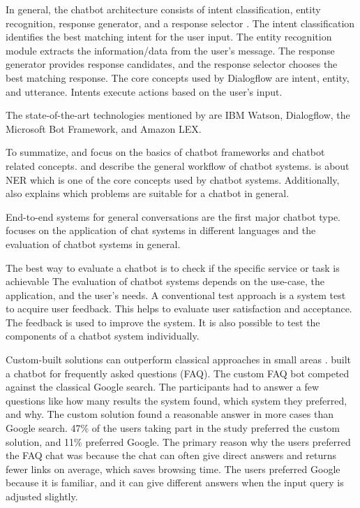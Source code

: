 In general, the chatbot architecture consists of intent classification, entity recognition, response generator, and a response selector  \cite{rahman2017programming}. 
The intent classification identifies the best matching intent for the user input.
The entity recognition module extracts the information/data from the user's message.
The response generator provides response candidates, and the response selector chooses the best matching response.
The core concepts used by Dialogflow are intent, entity, and utterance.
Intents execute actions based on the user's input. 

The state-of-the-art technologies mentioned by \citet{rahman2017programming} are IBM Watson, Dialogflow, the Microsoft Bot Framework, and Amazon LEX.

To summatize, \citet{deshpande2017survey,buiildChatbotsPython,geyer2016named} and \citet{rahman2017programming} focus on the basics of chatbot frameworks and chatbot related concepts.
\citet{deshpande2017survey} and \citet{rahman2017programming} describe the general workflow of chatbot systems.
\citet{geyer2016named} is about NER which is one of the core concepts used by chatbot systems.
Additionally, \citet{buiildChatbotsPython} also explains which problems are suitable for a chatbot in general.

End-to-end systems for general conversations are the first major chatbot type.
\citet{evaluateChatbotsShawar2007} focuses on the application of chat systems in different languages and the evaluation of chatbot systems in general.

The best way to evaluate a chatbot is to check if the specific service or task is achievable \cite{evaluateChatbotsShawar2007}
The evaluation of chatbot systems depends on the use-case, the application, and the user's needs.
A conventional test approach is a system test to acquire user feedback.
This helps to evaluate user satisfaction and acceptance.
The feedback is used to improve the system.
It is also possible to test the components of a chatbot system individually.

Custom-built solutions can outperform classical approaches in small areas \cite{evaluateChatbotsShawar2007}.
\citet{evaluateChatbotsShawar2007} built a chatbot for frequently asked questions (FAQ).
The custom FAQ bot competed against the classical Google search.
The participants had to answer a few questions like how many results the system found, which system they preferred, and why. 
The custom solution found a reasonable answer in more cases than Google search.
47\% of the users taking part in the study preferred the custom solution, and 11\% preferred Google.
The primary reason why the users preferred the FAQ chat was because the chat can often give direct answers and returns fewer links on average, which saves browsing time. 
The users preferred Google because it is familiar, and it can give different answers when the input query is adjusted slightly.

